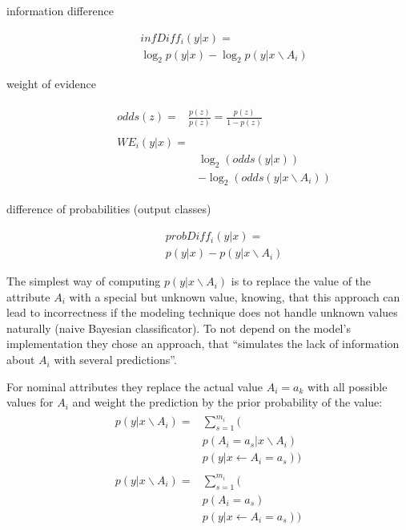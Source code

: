 \begin{description}
    \item[information difference] 
    \begin{multline}
        infDiff_{i}(y|x) = \\
        \log_{2} p(y|x)−\log_{2} p(y|x \backslash A_{i})
    \end{multline}
    \item[weight of evidence] 
    \begin{align}
        \begin{split}
            odds(z) ={}& \frac{p(z)}{p(\bar{z})} = \frac{p(z)}{1 − p(z)}
        \end{split}\\
        \begin{split}
            WE_{i}(y|x) ={}& \\
            & \log_{2} (odds(y|x)) \\
            & - \log_{2}(odds(y|x \backslash A_{i}))    
        \end{split}
    \end{align}
    \item[difference of probabilities (output classes)]
    \begin{multline}
        probDiff_{i} (y|x) = \\
        p(y|x)− p(y|x \backslash A_{i})
    \end{multline}
\end{description}
The simplest way of computing \(p(y|x \backslash A_{i})\) is to replace the value of the attribute \(A_{i}\) with a special but unknown value, knowing, that this approach can lead to incorrectness if the modeling technique does not handle unknown values naturally (naive Bayesian classificator).
To not depend on the model's implementation they chose an approach, that “simulates the lack of information about \(A_{i}\) with several predictions”\cite[4]{RobnikSikonja.2008}. \par For  nominal attributes they replace the actual value \(A_{i} = a_{k}\) with all possible values for \(A_{i}\) and weight the prediction by the prior probability of the value: 
\begin{align}
    \begin{split}
        p(y|x \backslash A_{i}) ={}& \sum_{s=1}^{m_{i}} \biggl(\\ 
        & p(A_{i} = a_{s} | x \backslash A_{i}) \\
        & p(y|x \leftarrow A_{i} = a_{s})\biggr)
    \end{split}\\
    \begin{split}
        p(y|x \backslash A_{i}) ={}& \sum_{s=1}^{m_{i}} \biggl(\\
        & p(A_{i} = a_{s}) \\
        & p(y|x \leftarrow A_{i} = a_{s}) \biggr)
    \end{split}
\end{align}

